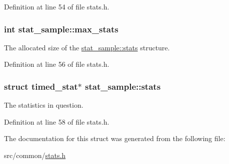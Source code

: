 Definition at line 54 of file stats.\-h.

\hypertarget{structstat__sample_a9915339fedc4af2eee8ded2869cdb351}{
\subsubsection[{max\-\_\-stats}]{\setlength{\rightskip}{0pt plus 5cm}int stat\-\_\-sample\-::max\-\_\-stats}}\label{structstat__sample_a9915339fedc4af2eee8ded2869cdb351}


The allocated size of the \hyperlink{structstat__sample_aa1e64901d0a1f17a163714488baa99fb}{stat\-\_\-sample\-::stats} structure. 



Definition at line 56 of file stats.\-h.

\hypertarget{structstat__sample_aa1e64901d0a1f17a163714488baa99fb}{
\subsubsection[{stats}]{\setlength{\rightskip}{0pt plus 5cm}struct {\bf timed\-\_\-stat}$\ast$ stat\-\_\-sample\-::stats}}\label{structstat__sample_aa1e64901d0a1f17a163714488baa99fb}


The statistics in question. 



Definition at line 58 of file stats.\-h.



The documentation for this struct was generated from the following file\-:\begin{DoxyCompactItemize}
\item 
src/common/\hyperlink{stats_8h}{stats.\-h}\end{DoxyCompactItemize}
